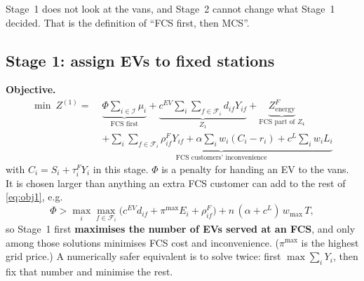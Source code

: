 \documentclass[11pt,a4paper]{article}
\newif\ifTOU \TOUfalse   %
\newcommand{\I}{\mathcal{I}}
\newcommand{\F}{\mathcal{F}}
\begin{document}
Stage~1 does not look at the vans, and Stage~2 cannot change what Stage~1 decided. That is the definition of ``FCS first, then MCS''.

\subsection{Stage 1: assign EVs to fixed stations}

\textbf{Objective.}
\begin{equation}
\begin{split}
\min\ Z^{(1)}=\;&\underbrace{\Phi\sum_{i\in\I}\mu_i}_{\text{FCS first}}
+\underbrace{c^{EV}\sum_i\sum_{f\in\F_i}d_{if}Y_{if}}_{Z_1}
+\underbrace{Z^F_{\text{energy}}}_{\text{FCS part of }Z_4}\\
&+\underbrace{\sum_i\sum_{f\in\F_i}\rho^F_{if}Y_{if}+\alpha\sum_i w_i(C_i-r_i)+c^L\sum_i w_iL_i}_{\text{FCS customers' inconvenience}}
\end{split}
\label{eq:obj1}
\end{equation}
with $C_i=S_i+\tau^F_iY_i$ in this stage. $\Phi$ is a penalty for handing an EV to the vans. It is chosen larger than anything an extra FCS customer can add to the rest of \eqref{eq:obj1}, e.g.
\[
\Phi > \max_{i}\max_{f\in\F_i}\big(c^{EV}d_{if}+\pi^{\max}E_i+\rho^F_{if}\big)+n\,(\alpha+c^L)\,w_{\max}\,T,
\]
so Stage~1 first \textbf{maximises the number of EVs served at an FCS}, and only among those solutions minimises FCS cost and inconvenience. ($\pi^{\max}$ is the highest grid price.) A numerically safer equivalent is to solve twice: first $\max\sum_iY_i$, then fix that number and minimise the rest.
\ifTOU
Because $Z^F_{\text{energy}}$ uses the peak price, Stage~1 may \emph{start sessions later} to leave the peak, if the price saving beats the extra waiting cost (Section~\ref{sec:expect}).
\fi
\end{document}
